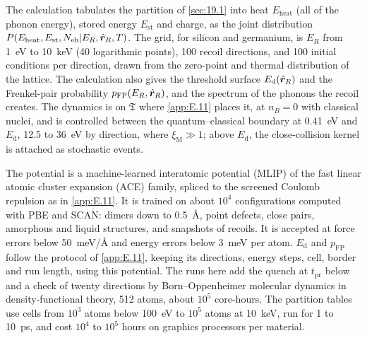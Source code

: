 The calculation tabulates the partition of \cref{sec:19.1} into heat $E_{\mathrm{heat}}$ (all of the phonon energy), stored energy $E_{\mathrm{st}}$ and charge, as the joint distribution $P(E_{\mathrm{heat}}, E_{\mathrm{st}}, N_{\mathrm{eh}}|E_R, \hat{\bm{r}}_R, T)$. The grid, for silicon and germanium, is $E_R$ from \SI{1}{eV} to \SI{10}{keV} (40 logarithmic points), 100 recoil directions, and 100 initial conditions per direction, drawn from the zero-point and thermal distribution of the lattice. The calculation also gives the threshold surface $E_{\mathrm{d}}(\hat{\bm{r}}_R)$ and the Frenkel-pair probability $p_{\mathrm{FP}}(E_R, \hat{\bm{r}}_R)$, and the spectrum of the phonons the recoil creates. The dynamics is on $\mathfrak{T}$ where \cref{app:E.11} places it, at $n_B = 0$ with classical nuclei, and is controlled between the quantum--classical boundary at \SI{0.41}{eV} and $E_{\mathrm{d}}$, 12.5 to \SI{36}{eV} by direction, where $\xi_{\mathrm{M}} \gg 1$; above $E_{\mathrm{d}}$, the close-collision kernel is attached as stochastic events.

The potential is a machine-learned interatomic potential (MLIP) of the fast linear atomic cluster expansion (ACE) family, spliced to the screened Coulomb repulsion as in \cref{app:E.11}. It is trained on about $10^4$ configurations computed with PBE and SCAN: dimers down to \SI{0.5}{\angstrom}, point defects, close pairs, amorphous and liquid structures, and snapshots of recoils. It is accepted at force errors below \SI{50}{meV/\angstrom} and energy errors below \SI{3}{meV} per atom. $E_{\mathrm{d}}$ and $p_{\mathrm{FP}}$ follow the protocol of \cref{app:E.11}, keeping its directions, energy steps, cell, border and run length, using this potential. The runs here add the quench at $t_{\mathrm{pr}}$ below and a check of twenty directions by Born--Oppenheimer molecular dynamics in density-functional theory, 512 atoms, about $10^5$ core-hours. The partition tables use cells from $10^3$ atoms below \SI{100}{eV} to $10^5$ atoms at \SI{10}{keV}, run for 1 to \SI{10}{ps}, and cost $10^4$ to $10^5$ hours on graphics processors per material.

